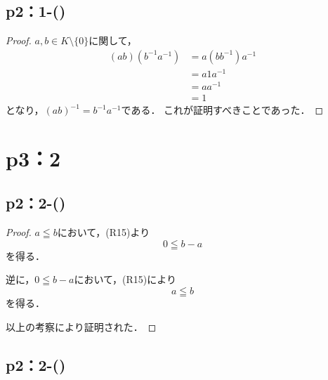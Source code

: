 \subsection*{p2：1-()}
\begin{leftbar}
    \begin{proof}
        $ a ,b\in K \setminus \{ 0 \} $に関して，
        \begin{align*}
            (ab) (b^{-1} a^{-1}) & = a (bb^{-1}) a^{-1} \\
                                 & = a1a^{-1}           \\
                                 & = aa^{-1}            \\
                                 & = 1
        \end{align*}
        となり，$(ab)^{-1} = b^{-1} a^{-1}$である．
        これが証明すべきことであった．
    \end{proof}
\end{leftbar}
%
\newpage
\section*{p3：2}

\subsection*{p2：2-()}

\begin{leftbar}
    \begin{proof}
        $a \leqq b$において，(R15)より
        \[
            0 \leqq b-a
        \]
        を得る．

        逆に，$0 \leqq b-a$において，(R15)により
        \[
            a \leqq b
        \]
        を得る．

        以上の考察により証明された．
    \end{proof}
\end{leftbar}

\subsection*{p2：2-()}

